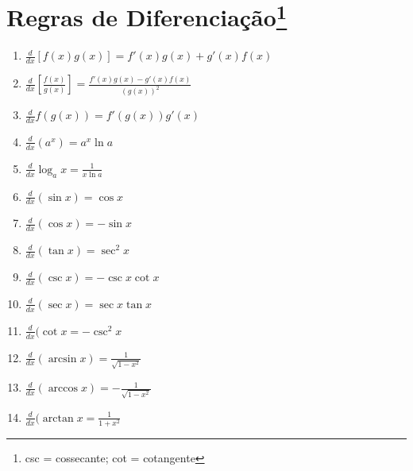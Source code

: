 \documentclass[12pt,openany, letterpaper]{book}
\begin{document}
{{\section*{Regras de Diferenciação\footnote{csc = cossecante; cot = cotangente}}
\begin{multicols}{2}
\begin{enumerate}
\item $\displaystyle{\frac{d}{dx} [f(x)g(x)] = f'(x)g(x) + g'(x)f(x)}$
\item $\displaystyle{\frac{d}{dx} \left[\frac{f(x)}{g(x)}\right] = \frac{f'(x)g(x) - g'(x)f(x)}{(g(x))^2}}$
\item $\displaystyle{\frac{d}{dx} f(g(x)) = f'(g(x))g'(x)}$
\item $\displaystyle{\frac{d}{dx} (a^x) = a^x \ln{a}}$
\item $\displaystyle{\frac{d}{dx} \log_a{x} = \frac{1}{x \ln a}}$
\item $\displaystyle{\frac{d}{dx} (\sin x) = \cos x}$
\item $\displaystyle{\frac{d}{dx} (\cos x) = -\sin x}$
\item $\displaystyle{\frac{d}{dx} (\tan x) = \sec^2 x}$
\item $\displaystyle{\frac{d}{dx} (\csc x) = -\csc x \cot x}$
\item $\displaystyle{\frac{d}{dx} (\sec x) = \sec x \tan x}$
\item $\displaystyle{\frac{d}{dx} (\cot x} = -\csc^2 x$
\item $\displaystyle{\frac{d}{dx} (\arcsin x) = \frac{1}{\sqrt{1-x^2}}}$
\item $\displaystyle{\frac{d}{dx} (\arccos x) = -\frac{1}{\sqrt{1-x^2}}}$
\item $\displaystyle{\frac{d}{dx} (\arctan x} = \frac{1}{1+x^2}$
\end{enumerate}
\end{multicols}

}}
\end{document}
